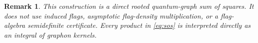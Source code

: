 \documentclass[11pt]{article}
\newtheorem{remark}[theorem]{Remark}
\begin{document}
\begin{remark}
This construction is a direct rooted quantum-graph sum of squares.  It does
not use induced flags, asymptotic flag-density multiplication, or a
flag-algebra semidefinite certificate.  Every product in \eqref{eq:sos} is
interpreted directly as an integral of graphon kernels.
\end{remark}
\end{document}
